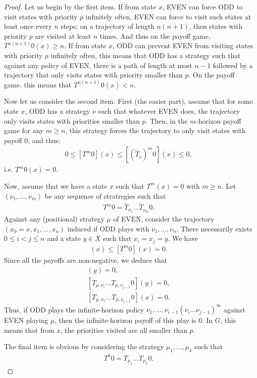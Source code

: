 \documentclass{article}
\begin{document}
\begin{proof}  
  Let us begin by the first item. If from state $x$, EVEN can force ODD to visit states with priority $p$ infinitely often, EVEN can force to visit such states at least once every $n$ steps; on a trajectory of length $n(n+1)$, then states with priority $p$ are visited at least $n$ times. And thus on the payoff game, $T^{n(n+1)}0(x) \ge n$. If from state $x$, ODD can prevent EVEN from visiting states with priority $p$ infinitely often, this means that ODD has a strategy such that against any policy of EVEN, there is a path of length at most $n-1$ followed by a trajectory that only visits states with priority smaller than $p$. On the payoff game, this means that $T^{n(n+1)}0(x) < n$.

  Now let us consider the second item.
  First (the easier part), assume that for some state $x$, ODD has a strategy $\nu$ such that whatever EVEN does, the trajectory only visits states with priorities smaller than $p$. Then, in the $m$-horizon payoff game for any $m \ge n$, this strategy forces the trajectory to only visit states with payoff $0$, and thus:
  \begin{align}
   0 \le [T^m 0](x) \le [(\tilde T_{\nu})^m 0](x) \le 0,
  \end{align}
  i.e. $T^m 0(x)=0$.

  Now, assume that we have a state $x$ such that $T^m(x)=0$ with $m \ge n$. Let $(\nu_1,\dots,\nu_m)$ be any sequence of stratregies such that
  \begin{align}
  T^m 0 = \tilde T_{\nu_1} \dots \tilde T_{\nu_m} 0.
  \end{align}
  Against any (positional) strategy $\mu$ of EVEN, consider the trajectory $(x_0=x,x_1,\dots,x_n)$ induced if ODD plays with $\nu_1,\dots,\nu_n$. There necessarily exists $0 \le i<j\le n$ and a state $y \in X$ such that $x_i=x_j=y$. We have
  \begin{align}
    [T_{\mu,\nu_1} \dots T_{\mu,\nu_{i-1}} T_{\mu,\nu_i} \dots T_{\mu,\nu_{j-1}} T^{m-j}0](x) \le [T^m 0](x) = 0.
  \end{align}
  Since all the payoffs are non-negative, we deduce that
  \begin{align}
    [T^{m-j}0](y)=0, \\
    [T_{\mu,\nu_i} \dots T_{\mu,\nu_{j-1}} 0](y)=0, \\
    [T_{\mu,\nu_1} \dots T_{\mu,\nu_{i-1}} 0](x)=0.
  \end{align}
  Thus, if ODD plays the infinite-horizon policy $\nu_1,\dots,\nu_{i-1}(\nu_i \dots \nu_{j-1})^\infty$ against EVEN playing $\mu$, then the infinite-horizon payoff of this play is $0$. In $G$, this means that from $x$, the priorities visited are all smaller than $p$.

  The final item is obvious by considering the strategy $\mu_1,\dots,\mu_k$ such that
  \begin{align}
    T^k 0 = T_{\mu_1} \dots T_{\mu_k} 0.
  \end{align}
\end{proof}
\end{document}
